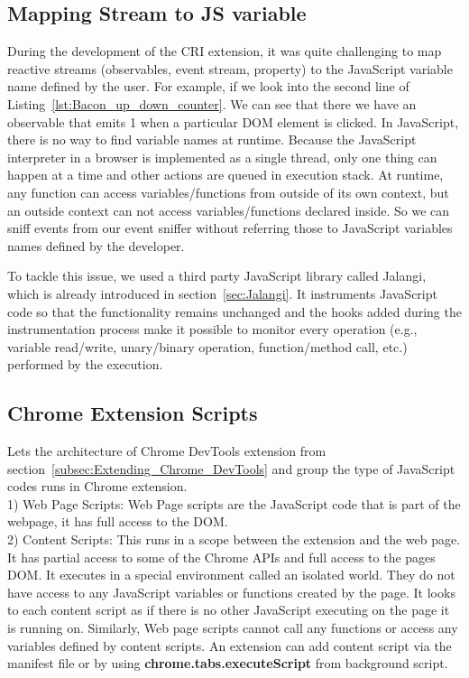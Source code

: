 \subsection{Mapping Stream to JS variable}
During the development of the CRI extension, it was quite challenging to map reactive streams (observables, event stream, property) to the JavaScript variable name defined by the user. For example, if we look into the second line of Listing~\ref{lst:Bacon_up_down_counter}. We can see that there we have an observable that emits 1 when a particular DOM element is clicked. In JavaScript, there is no way to find variable names at runtime. Because the JavaScript interpreter in a browser is implemented as a single thread, only one thing can happen at a time and other actions are queued in execution stack. At runtime, any function can access variables/functions from outside of its own context, but an outside context can not access variables/functions declared inside.
So we can sniff events from our event sniffer without referring those to JavaScript variables names defined by the developer. 

To tackle this issue, we used a third party JavaScript library called Jalangi, which is already introduced in section~\ref{sec:Jalangi}. 
It instruments JavaScript code so that the functionality remains unchanged and the hooks added during the instrumentation process make it possible to monitor every operation (e.g., variable read/write, unary/binary operation, function/method call, etc.) performed by the execution.

\subsection{Chrome Extension Scripts}
Lets the architecture of Chrome DevTools extension from section~\ref{subsec:Extending_Chrome_DevTools} and group the type of JavaScript codes runs in Chrome extension.\\

1) Web Page Scripts: Web Page scripts are the JavaScript code that is part of the webpage, it has full access to the DOM.\\

2) Content Scripts: This runs in a scope between the extension and the web page.  It has partial access to some of the Chrome APIs and full access to the page\textquotesingle s DOM. It executes in a special environment called an isolated world. They do not have access to any JavaScript variables or functions created by the page. It looks to each content script as if there is no other JavaScript executing on the page it is running on. Similarly, Web page scripts cannot call any functions or access any variables defined by content scripts.
An extension can add content script via the manifest file or by using \textbf{chrome.tabs.executeScript} from background script.\\

